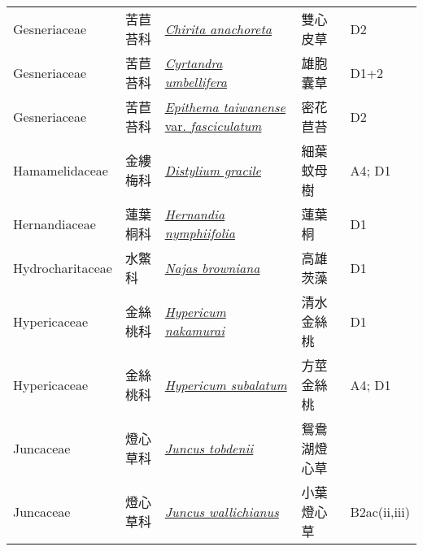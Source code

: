{\begin{longtable}{p{2.5cm}p{2cm}p{5cm}p{2.5cm}p{3cm}}
    Gesneriaceae & 苦苣苔科 & \href{http://www.theplantlist.org/tpl1.1/search?q=Chirita+anachoreta}{\textit{Chirita anachoreta} } & 雙心皮草 & D2 \index{Chirita@\textit{Chirita}!anachoreta@\textit{anachoreta}}  \index{雙心皮草} \\
    Gesneriaceae & 苦苣苔科 & \href{http://www.theplantlist.org/tpl1.1/search?q=Cyrtandra+umbellifera}{\textit{Cyrtandra umbellifera} } & 雄胞囊草 & D1+2 \index{Cyrtandra@\textit{Cyrtandra}!umbellifera@\textit{umbellifera}}  \index{雄胞囊草} \\
    Gesneriaceae & 苦苣苔科 & \href{http://www.theplantlist.org/tpl1.1/search?q=Epithema+taiwanense+var.+fasciculatum}{\textit{Epithema taiwanense} var. \textit{fasciculatum} } & 密花苣苔 & D2 \index{Epithema@\textit{Epithema}!taiwanense@\textit{taiwanense}!var. fasciculatum@var. \textit{fasciculatum}}  \index{密花苣苔} \\
    Hamamelidaceae & 金縷梅科 & \href{http://www.theplantlist.org/tpl1.1/search?q=Distylium+gracile}{\textit{Distylium gracile} } & 細葉蚊母樹 & A4; D1 \index{Distylium@\textit{Distylium}!gracile@\textit{gracile}}  \index{細葉蚊母樹} \\
    Hernandiaceae & 蓮葉桐科 & \href{http://www.theplantlist.org/tpl1.1/search?q=Hernandia+nymphiifolia}{\textit{Hernandia nymphiifolia} } & 蓮葉桐 & D1 \index{Hernandia@\textit{Hernandia}!nymphiifolia@\textit{nymphiifolia}}  \index{蓮葉桐} \\
    Hydrocharitaceae & 水鱉科 & \href{http://www.theplantlist.org/tpl1.1/search?q=Najas+browniana}{\textit{Najas browniana} } & 高雄茨藻 & D1 \index{Najas@\textit{Najas}!browniana@\textit{browniana}}  \index{高雄茨藻} \\
    Hypericaceae & 金絲桃科 & \href{http://www.theplantlist.org/tpl1.1/search?q=Hypericum+nakamurai}{\textit{Hypericum nakamurai} } & 清水金絲桃 & D1 \index{Hypericum@\textit{Hypericum}!nakamurai@\textit{nakamurai}}  \index{清水金絲桃} \\
    Hypericaceae & 金絲桃科 & \href{http://www.theplantlist.org/tpl1.1/search?q=Hypericum+subalatum}{\textit{Hypericum subalatum} } & 方莖金絲桃 & A4; D1 \index{Hypericum@\textit{Hypericum}!subalatum@\textit{subalatum}}  \index{方莖金絲桃} \\
    Juncaceae & 燈心草科 & \href{http://www.theplantlist.org/tpl1.1/search?q=Juncus+tobdenii}{\textit{Juncus tobdenii} } & 鴛鴦湖燈心草 &  \index{Juncus@\textit{Juncus}!tobdenii@\textit{tobdenii}}  \index{鴛鴦湖燈心草} \\
    Juncaceae & 燈心草科 & \href{http://www.theplantlist.org/tpl1.1/search?q=Juncus+wallichianus}{\textit{Juncus wallichianus} } & 小葉燈心草 & B2ac(ii,iii) \index{Juncus@\textit{Juncus}!wallichianus@\textit{wallichianus}}  \index{小葉燈心草} \\

\end{longtable}}
